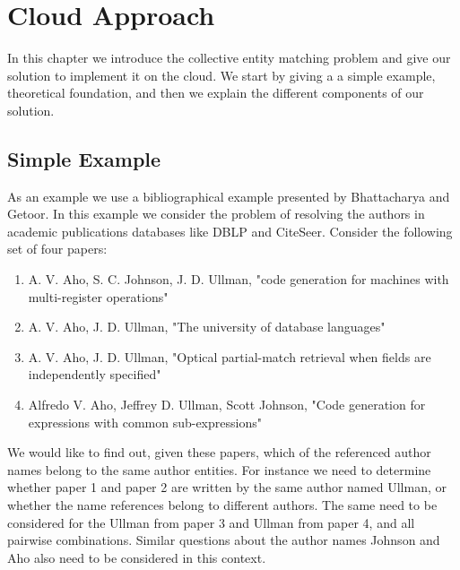 \chapter {Cloud Approach}
In this chapter we introduce the collective entity matching problem and give our solution to implement it on the cloud. We start by giving a a simple example, theoretical foundation, and then we explain the different components of our solution.

\section{Simple Example}
As an example we use a bibliographical example presented by Bhattacharya and Getoor\cite{BhGe06b}. In this example we consider the problem of resolving the authors in academic publications databases like DBLP and CiteSeer. Consider the following set of four papers:

\begin{enumerate}
\item A. V. Aho, S. C. Johnson, J. D. Ullman, "code generation for machines with multi-register operations"
\item A. V. Aho, J. D. Ullman, "The university of database languages"
\item A. V. Aho, J. D. Ullman, "Optical partial-match retrieval when fields are independently specified"
\item Alfredo V. Aho, Jeffrey D. Ullman, Scott Johnson, "Code generation for expressions with common sub-expressions"
\end{enumerate}

We would like to find out, given these papers, which of the referenced author names belong to the same author entities. For instance we need to determine whether paper 1 and paper 2 are written by the same author named Ullman, or whether the name references belong to different authors. The same need to be considered for the Ullman from paper 3 and Ullman from paper 4, and all pairwise combinations. Similar questions about the author names Johnson and Aho also need to be considered in this context. 

